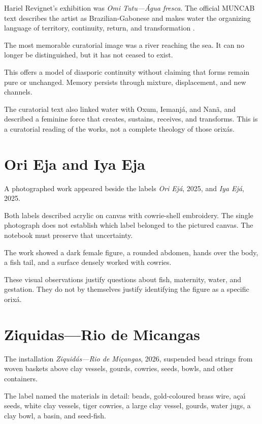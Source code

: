 Hariel Revignet's exhibition was
\emph{Omi Tutu---\'Agua fresca}.  The
official MUNCAB text describes the artist
as Brazilian-Gabonese and makes water the
organizing language of territory,
continuity, return, and transformation
\cite{muncab2026omitutu}.

The most memorable curatorial image was a
river reaching the sea.  It can no longer
be distinguished, but it has not ceased to
exist.

This offers a model of diasporic continuity
without claiming that forms remain pure or
unchanged.  Memory persists through
mixture, displacement, and new channels.

The curatorial text also linked water with
Oxum, Iemanj\'a, and Nan\~a, and described
a feminine force that creates, sustains,
receives, and transforms.  This is a
curatorial reading of the works, not a
complete theology of those orix\'as.

\section{Ori Eja and Iya Eja}
\label{section-hariel-ori-iya}

A photographed work appeared beside the
labels \emph{Ori Ej\'a}, 2025, and
\emph{Iya Ej\'a}, 2025.

Both labels described acrylic on canvas
with cowrie-shell embroidery.  The single
photograph does not establish which label
belonged to the pictured canvas.  The
notebook must preserve that uncertainty.

The work showed a dark female figure, a
rounded abdomen, hands over the body, a
fish tail, and a surface densely worked
with cowries.

These visual observations justify
questions about fish, maternity, water,
and gestation.  They do not by themselves
justify identifying the figure as a
specific orix\'a.

\section{Ziquidas---Rio de Micangas}
\label{section-hariel-ziquidas}

The installation
\emph{Ziquid\'as---Rio de Mi\c{c}angas},
2026, suspended bead strings from woven
baskets above clay vessels, gourds, cowries,
seeds, bowls, and other containers.

The label named the materials in detail:
beads, gold-coloured brass wire,
a\c{c}a\'\i{} seeds, white clay vessels,
tiger cowries, a large clay vessel, gourds,
water jugs, a clay bowl, a basin, and
seed-fish.

